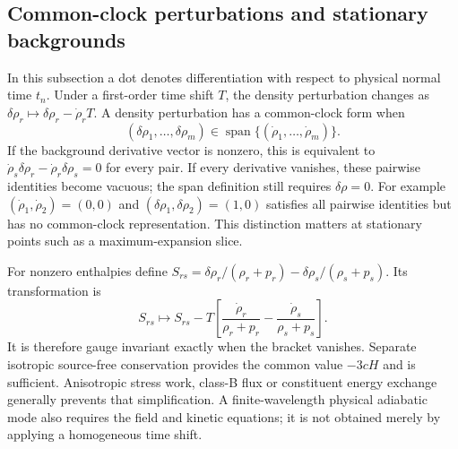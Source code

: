 \subsection{Common-clock perturbations and stationary backgrounds}
\label{geo:adiabatic_alignment}
In this subsection a dot denotes differentiation with respect to physical normal time $t_n$. Under a first-order time shift $T$, the density perturbation changes as
$\delta\rho_r\mapsto\delta\rho_r-\dot\rho_rT$. A density perturbation has a common-clock form when
\begin{equation}
 (\delta\rho_1,\ldots,\delta\rho_m)
      \in\operatorname{span}\{(\dot\rho_1,\ldots,\dot\rho_m)\}.
 \label{geo:common_clock}
\end{equation}
If the background derivative vector is nonzero, this is equivalent to
$\dot\rho_s\delta\rho_r-\dot\rho_r\delta\rho_s=0$ for every pair. If every derivative vanishes, these pairwise identities become vacuous; the span definition still requires $\delta\rho=0$. For example $(\dot\rho_1,\dot\rho_2)=(0,0)$ and $(\delta\rho_1,\delta\rho_2)=(1,0)$ satisfies all pairwise identities but has no common-clock representation. This distinction matters at stationary points such as a maximum-expansion slice.

For nonzero enthalpies define
$S_{rs}=\delta\rho_r/(\rho_r+p_r)-\delta\rho_s/(\rho_s+p_s)$.
Its transformation is
\begin{equation}
 S_{rs}\mapsto S_{rs}-T\left[
 \frac{\dot\rho_r}{\rho_r+p_r}-\frac{\dot\rho_s}{\rho_s+p_s}\right].
 \label{geo:entropy_gauge}
\end{equation}
It is therefore gauge invariant exactly when the bracket vanishes. Separate isotropic source-free conservation provides the common value $-3cH$ and is sufficient. Anisotropic stress work, class-B flux or constituent energy exchange generally prevents that simplification. A finite-wavelength physical adiabatic mode also requires the field and kinetic equations; it is not obtained merely by applying a homogeneous time shift.

